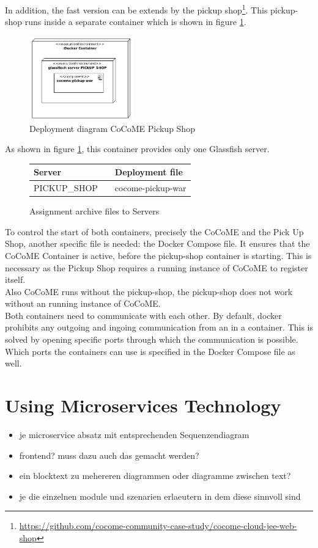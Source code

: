 	In addition, the fast version can be extends by the pickup shop\footnote{\url{https://github.com/cocome-community-case-study/cocome-cloud-jee-web-shop}}. This pickup-shop runs inside a separate container which is shown in figure \ref{Deploym_Pickup}.  
	\begin{figure}[h]
		\centering
		\includegraphics[width = 0.4\textwidth]{img/docker_Container_PickUP.png}
		\caption{Deployment diagram CoCoME Pickup Shop}
		\label{Deploym_Pickup}
	\end{figure}
	As shown in figure \ref*{Deploym_Pickup}, this container provides only one Glassfish server.
	\begin{figure}[H]
		\centering
		\begin{tabular}{p{}|p{}p{}}
			Server && Deployment file \\
			\hline
			PICKUP\_SHOP && cocome-pickup-war \\	
		\end{tabular}
		\caption{Assignment archive files to Servers}
		\label{table_assignment_pickup}
	\end{figure}
	To control the start of both containers, precisely the CoCoME and the Pick Up Shop, another specific file is needed: the Docker Compose file. It ensures that the CoCoME Container is active, before the pickup-shop container is starting. This is necessary as the Pickup Shop requires a running instance of CoCoME to register itself.\\
	Also CoCoME runs without the pickup-shop, the pickup-shop does not work without an running instance of CoCoME.\\
	Both containers need to communicate with each other. By default, docker prohibits any outgoing and ingoing communication from an in a container. This is solved by opening specific ports through which the communication is possible. Which ports the containers can use is specified in the Docker Compose file as well.
	
\section{Using Microservices Technology} \label{MS}
	\begin{itemize}
		\item je microservice absatz mit entsprechenden Sequenzendiagram %
		\item frontend? muss dazu auch das gemacht werden?
		\item ein blocktext zu mehereren diagrammen oder diagramme zwischen text?
		
	
			\item je die einzelnen module und szenarien erlaeutern in dem diese sinnvoll sind
	\end{itemize}
	

